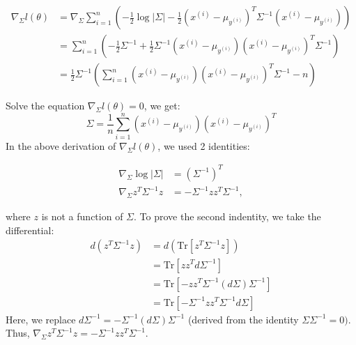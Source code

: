 \begin{answer}
\begin{align}
	\nabla_{\Sigma} l(\theta) 
	&= \nabla_{\Sigma} \sum \limits_{i = 1}^{n} \left(- \frac{1}{2}\log |\Sigma| - \frac{1}{2}(x^{(i)} - \mu_{y^{(i)}})^T \Sigma^{-1} (x^{(i)} - \mu_{y^{(i)}}) \right) \\
	&= \sum \limits_{i = 1}^{n} \left( -\frac{1}{2} \Sigma^{-1} + \frac{1}{2}  \Sigma^{-1} (x^{(i)} - \mu_{y^{(i)}}) (x^{(i)} - \mu_{y^{(i)}})^T \Sigma^{-1} \right) \\
	&= \frac{1}{2} \Sigma^{-1}\left( \sum \limits_{i = 1}^{n} (x^{(i)} - \mu_{y^{(i)}}) (x^{(i)} - \mu_{y^{(i)}})^T \Sigma^{-1} - n \right)
\end{align}

Solve the equation $\nabla_{\Sigma} l(\theta) = 0$, we get:
$$\widehat\Sigma = \frac{1}{n} \sum \limits_{i = 1}^{n} (x^{(i)} - \mu_{y^{(i)}}) (x^{(i)} - \mu_{y^{(i)}})^T$$
In the above derivation of $\nabla_{\Sigma} l(\theta)$, we used 2 identities:

\begin{align}
\nabla_{\Sigma}\log|\Sigma| &= (\Sigma^{-1})^T \\
\nabla_{\Sigma} z^T\Sigma^{-1} z &= -\Sigma^{-1} z z^T \Sigma^{-1}, 
\end{align}

where $z$ is not a function of $\Sigma$. To prove the second indentity, we take the differential:
\begin{align}
	d(z^T \Sigma^{-1} z) 
	&= d(\text{Tr}[z^T \Sigma^{-1} z]) \\
	&= \text{Tr}[z z^T d\Sigma^{-1}] \\
	&= \text{Tr}[-z z^T \Sigma^{-1} (d\Sigma) \Sigma^{-1}] \\
	&= \text{Tr}[-\Sigma^{-1} z z^T \Sigma^{-1} d\Sigma]
\end{align}
Here, we replace $ d\Sigma^{-1} = -\Sigma^{-1}(d\Sigma)\Sigma^{-1} $ (derived from the identity $\Sigma \Sigma^{-1} = 0)$. Thus, $\nabla_{\Sigma} z^T\Sigma^{-1} z = -\Sigma^{-1} z z^T \Sigma^{-1}$. \\
\end{answer}
